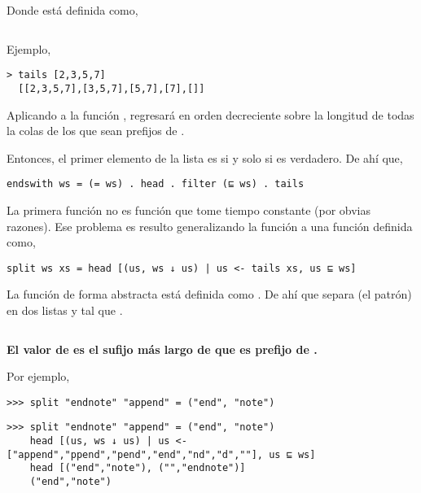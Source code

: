 Donde  está definida como,

\inputminted{haskell}{definiciones/tails.hs}

Ejemplo,

\begin{verbatim}
> tails [2,3,5,7]
  [[2,3,5,7],[3,5,7],[5,7],[7],[]]
\end{verbatim}

Aplicando  a la función , regresará en orden decreciente sobre la longitud de
todas la colas de  los que sean prefijos de .


Entonces, el primer elemento de la lista es  si y solo si  es verdadero. De ahí que,

\begin{verbatim}
endswith ws = (= ws) . head . filter (⊑ ws) . tails
\end{verbatim}


La primera función  no es función que tome tiempo constante (por obvias razones). Ese problema es resulto generalizando la función
 a una función  definida como,

\begin{verbatim}
split ws xs = head [(us, ws ↓ us) | us <- tails xs, us ⊑ ws]
\end{verbatim}

La función  de forma abstracta está definida como . De ahí que  separa  (el patrón)
en dos listas  y  tal que .

\inputminted{haskell}{definiciones/kmp/1-down-arrow.hs}

\begin{center}
\textbf{El valor de  es el sufijo más largo de  que es prefijo de .}
\end{center}

Por ejemplo,
\begin{verbatim}
>>> split "endnote" "append" = ("end", "note")
\end{verbatim}

\begin{verbatim}
>>> split "endnote" "append" = ("end", "note")
    head [(us, ws ↓ us) | us <- ["append","ppend","pend","end","nd","d",""], us ⊑ ws]
    head [("end","note"), ("","endnote")]
    ("end","note")
\end{verbatim}

